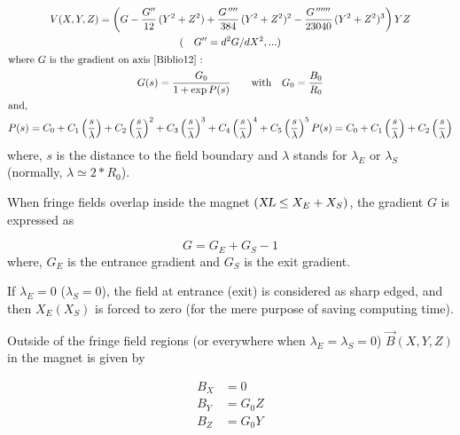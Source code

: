  \begin{gather*}
 	V(X,Y,Z)     =   \left(G- \dfrac{G^{\prime\prime} }{ 12}\, (Y^2+Z^2)+
	             \dfrac{G^{\quaprime} }{ 384}\, (Y^2+Z^2)^2-
	             \dfrac{G^{\cinqprime\prime} }{ 23040}\, (Y^2+Z^2)^3 \right)YZ  \\
	(\quad G^{\prime\prime} =d^2G/dX^2,...) \\
\intertext{where $ G $ is the gradient on axis~\protect\cite{Biblio12}~:  } %
    G(s) = \dfrac{G_0 }{ 1+ \exp  P(s)}\qquad \text{with} \quad G_0=\dfrac{B_0}{R_0} \\
\intertext{and,}
     P(s) = C_0
       +C_1 \left(  \dfrac{s }{ \lambda} \right) 
       +C_2 \left( \dfrac{s }{ \lambda} \right)^2 
       + C_3 \left( \dfrac{s }{ \lambda} \right)^3 
       +C_4 \left( \dfrac{s }{ \lambda} \right)^4 
       + C_5 \left(\dfrac{s }{ \lambda} \right)^5
       P(s)=C_0+C_1 \left(\dfrac{s }{ \lambda} \right) + C_2 \left(\dfrac{s }{ \lambda}\right)
\end{gather*}
%
 where, $ s $ is the distance to the field boundary and $\lambda$
stands for $ \lambda_ E $ or $ \lambda_ S $ 
(normally, $ \lambda  \simeq  2  \ast  R_0$). 

\noindent When fringe fields overlap inside the magnet $ (\textsl{XL}\leq X_E+X_S)$,  
the gradient $ G $ is expressed as 

$$ G = G_E+G_S-1 $$
%
where, $ G_E $ is the entrance gradient and $ G_S $ is the exit gradient. 

\noindent If $ \lambda_ E=0$ ($\lambda_ S=0$),  the field at entrance 
(exit) is considered as sharp edged, and then $ X_E(X_S) $ is forced to zero 
(for the mere purpose of saving computing time). 

\noindent Outside of the fringe field regions (or everywhere when 
$ \lambda_E=\lambda_ S=0$)   $ \vec  B(X,Y,Z) $ in the magnet is given by 

\begin{align*}
	B_X &   =     0 \\
	B_Y &   =    G_0Z \\
	B_Z &   =     G_0Y  
\end{align*}

\newpage


